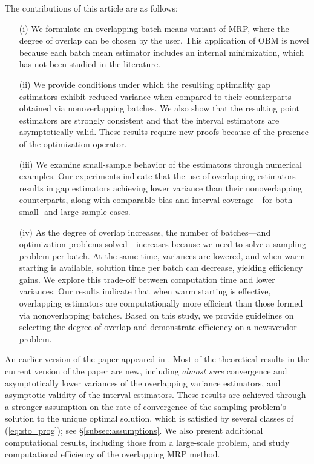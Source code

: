 \documentclass[12pt]{article}
\begin{document}
The contributions of this article are as follows: 
\begin{itemize}
\item[(i)] We formulate an overlapping batch means variant of MRP, where the degree of overlap can be chosen by the user.  
This application of OBM is novel because each batch mean estimator includes an internal minimization, which has not been studied in the literature.

\item[(ii)] We provide conditions under which the resulting optimality gap estimators exhibit reduced variance when compared to their counterparts obtained via nonoverlapping batches.
We also show that the resulting point estimators are strongly consistent and that the interval estimators are asymptotically valid. 
These results require new proofs because of the presence of the optimization operator. 

\item[(iii)] We examine small-sample behavior of the estimators through numerical examples. 
Our experiments indicate that the use of overlapping estimators results in gap estimators achieving lower variance than their nonoverlapping counterparts, along with comparable bias and interval coverage---for both small- and large-sample cases.

\item[(iv)] As the degree of overlap increases, the number of batches---and optimization problems solved---increases because we need to solve a sampling problem per batch. 
At the same time, variances are lowered, and when warm starting is available, solution time per batch can decrease, yielding efficiency gains. 
We explore this trade-off between computation time and lower variances.
Our results indicate that when warm starting is effective, overlapping estimators are computationally more efficient than those formed via nonoverlapping batches.
Based on this study, we provide guidelines on selecting the degree of overlap and demonstrate efficiency on a newsvendor problem. 
\end{itemize}


An earlier version of the paper appeared in \citep{love2011overlapping}. 
Most of the theoretical results in the current version of the paper are new, including {\it almost sure} convergence and asymptotically lower variances of the overlapping variance estimators, and asymptotic validity of the interval estimators. 
These results are achieved through a stronger assumption on the rate of convergence of the sampling problem's solution to the unique optimal solution, which is satisfied by several classes of (\ref{eq:sto_prog}); see \S \ref{subsec:assumptions}.
We also present additional computational results, including those from a large-scale problem, and study computational efficiency of the overlapping MRP method. 
\end{document}
